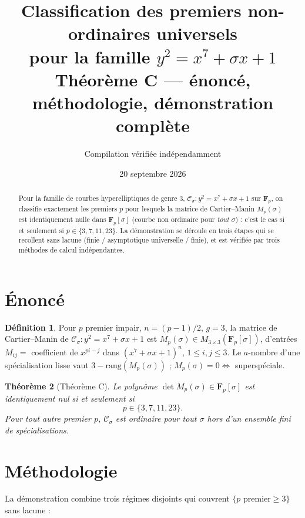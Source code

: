 \documentclass[12pt,a4paper]{article}
\title{Classification des premiers non-ordinaires universels\\
pour la famille $y^2=x^7+\sigma x+1$\\[0.3em]
\large Théorème C — énoncé, méthodologie, démonstration complète}
\author{Compilation vérifiée indépendamment}
\date{20 septembre 2026}
\newtheorem{theorem}{Théorème}
\theoremstyle{definition}
\newtheorem{definition}[theorem]{Définition}
\begin{document}
\maketitle

\begin{abstract}
\noindent Pour la famille de courbes hyperelliptiques de genre 3, $\mathcal C_\sigma : y^2=x^7+\sigma x+1$ sur $\mathbf F_p$, on classifie exactement les premiers $p$ pour lesquels la matrice de Cartier--Manin $M_p(\sigma)$ est identiquement nulle dans $\mathbf F_p[\sigma]$ (courbe non ordinaire pour \emph{tout} $\sigma$) : c'est le cas si et seulement si $p\in\{3,7,11,23\}$. La démonstration se déroule en trois étapes qui se recollent sans lacune (finie / asymptotique universelle / finie), et est vérifiée par trois méthodes de calcul indépendantes.
\end{abstract}

\tableofcontents

\section{Énoncé}

\begin{definition}
Pour $p$ premier impair, $n=(p-1)/2$, $g=3$, la matrice de Cartier--Manin de $\mathcal C_\sigma: y^2=x^7+\sigma x+1$ est $M_p(\sigma)\in M_{3\times3}(\mathbf F_p[\sigma])$, d'entrées $M_{ij}=$ coefficient de $x^{pi-j}$ dans $(x^7+\sigma x+1)^n$, $1\le i,j\le3$. Le $a$-nombre d'une spécialisation lisse vaut $3-\mathrm{rang}(M_p(\sigma))$ ; $M_p(\sigma)=0\Leftrightarrow$ superspéciale.
\end{definition}

\begin{theorem}[Théorème C]\label{thm:C}
Le polynôme $\det M_p(\sigma)\in\mathbf F_p[\sigma]$ est identiquement nul si et seulement si
\[
p\in\{3,7,11,23\}.
\]
Pour tout autre premier $p$, $\mathcal C_\sigma$ est ordinaire pour tout $\sigma$ hors d'un ensemble fini de spécialisations.
\end{theorem}

\section{Méthodologie}

La démonstration combine trois régimes disjoints qui couvrent $\{p\text{ premier}\ge3\}$ sans lacune :
\end{document}
